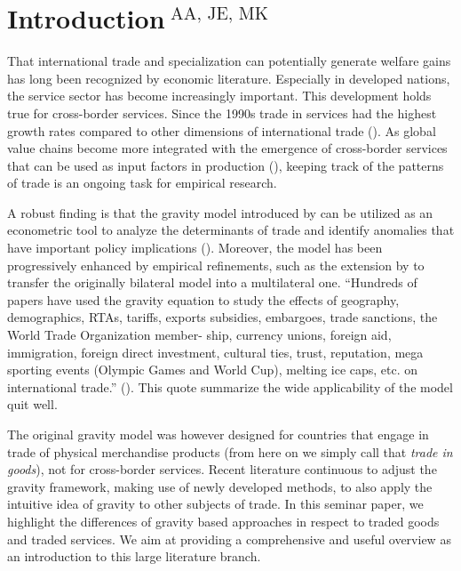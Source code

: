 \section[Introduction]{Introduction$^{\text{ AA, JE, MK}}$} 
\label{sec:Introduction}

That international trade and specialization can potentially generate welfare gains has long been recognized by economic literature. Especially in developed nations, the service sector has become increasingly important. This development holds true for cross-border services. Since the 1990s trade in services had the highest growth rates compared to other dimensions of international trade (\cite{Breinlich_and}). As global value chains become more integrated with the emergence of cross-border services that can be used as input factors in production (\cite{understanding_2023}), keeping track of the patterns of trade is an ongoing task for empirical research. 

A robust finding is that the gravity model introduced by \textcite{tinbergen1962shaping} can be utilized as an econometric tool to analyze the determinants of trade and identify anomalies that have important policy implications (\cite[p. 41]{krugman2019}). Moreover, the model has been progressively enhanced by empirical refinements, such as the extension by \textcite{Anderson2003} to transfer the originally bilateral model into a multilateral one. \enquote{Hundreds of papers have used the gravity equation to study the effects of geography, demographics, RTAs, tariffs, exports subsidies, embargoes, trade sanctions, the World Trade Organization member- ship, currency unions, foreign aid, immigration, foreign direct investment, cultural ties, trust, reputation, mega sporting events (Olympic Games and World Cup), melting ice caps, etc. on international trade.} (\cite[p. 17]{yotov2016advanced}). This quote summarize the wide applicability of the model quit well.

The original gravity model was however designed for countries that engage in trade of physical merchandise products (from here on we simply call that \textit{trade in goods}), not for cross-border services. Recent literature continuous to adjust the gravity framework, making use of newly developed methods, to also apply the intuitive idea of gravity to other subjects of trade. In this seminar paper, we highlight the differences of gravity based approaches in respect to traded goods and traded services. We aim at providing a comprehensive and useful overview as an introduction to this large literature branch.

